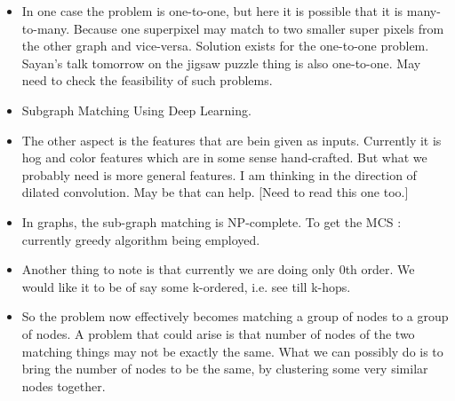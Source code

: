 \documentclass{article}
\begin{document}
\begin{itemize}
\item In one case the problem is one-to-one, but here it is possible that it is many-to-many. Because one superpixel may match to two smaller super pixels from the other graph and vice-versa. Solution exists for the one-to-one problem. Sayan's talk tomorrow on the jigsaw puzzle thing is also one-to-one. May need to check the feasibility of such problems.
\item Subgraph Matching Using Deep Learning.
\item The other aspect is the features that are bein given as inputs. Currently it is hog and color features which are in some sense hand-crafted. But what we probably need is more general features. I am thinking in the direction of dilated convolution. May be that can help. [Need to read this one too.]
\item In graphs, the sub-graph matching is NP-complete. To get the MCS : currently greedy algorithm being employed.
\item Another thing to note is that currently we are doing only 0th order. We would like it to be of say some k-ordered, i.e. see till k-hops.
\item So the problem now effectively becomes matching a group of nodes to a group of nodes. A problem that could arise is that number of nodes of the two matching things may not be exactly the same. What we can possibly do is to bring the number of nodes to be the same, by clustering some very similar nodes together.
\end{itemize}




\end{document}

